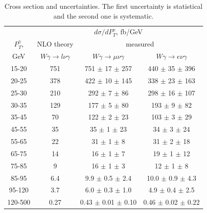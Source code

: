 \begin{table}[h]
  \scriptsize
  \begin{center}
  \caption{Cross section and uncertainties. The first uncertainty is statistical and the second one is systematic.}
  \begin{tabular}{|c|c|c|c|}
                     & \multicolumn{3}{|c|}{$d\sigma/dP_{T}^{\gamma}$, fb/GeV} \\ 
     $P_T^{\gamma}$, & NLO theory                          &  \multicolumn{2}{|c|}{measured}      \\
    GeV              &  $W\gamma\rightarrow l\nu\gamma$ & $W\gamma\rightarrow \mu\nu\gamma$  & $W\gamma\rightarrow e\nu\gamma$    \\ \hline
    15-20 & 751 & 751 $\pm$ 17 $\pm$ 257 & 440 $\pm$ 35 $\pm$ 396\\ \hline
    20-25 & 378 & 422 $\pm$ 10 $\pm$ 145 & 338 $\pm$ 23 $\pm$ 163\\ \hline
    25-30 & 210 & 292 $\pm$ 7 $\pm$ 86 & 298 $\pm$ 16 $\pm$ 107\\ \hline
    30-35 & 129 & 177 $\pm$ 5 $\pm$ 80  & 193 $\pm$ 9 $\pm$ 82\\ \hline
    35-45 & 70 & 122 $\pm$ 2 $\pm$ 23 & 103 $\pm$ 3 $\pm$ 29\\ \hline
    45-55 & 35 & 35 $\pm$ 1 $\pm$ 23 & 34 $\pm$ 3 $\pm$ 24\\ \hline
    55-65 & 22 & 31 $\pm$ 1 $\pm$ 8  & 31 $\pm$ 2 $\pm$ 18\\ \hline
    65-75 & 14 & 16 $\pm$ 1 $\pm$ 7 & 19 $\pm$ 1 $\pm$ 12 \\ \hline
    75-85 & 9 & 16 $\pm$ 1 $\pm$ 3 & 12 $\pm$ 1 $\pm$ 8\\ \hline
    85-95 & 6.4 & 9.9 $\pm$ 0.5 $\pm$ 2.4 & 10.0 $\pm$ 0.9 $\pm$ 4.3\\ \hline
    95-120 & 3.7 & 6.0 $\pm$ 0.3 $\pm$ 1.0 & 4.9 $\pm$ 0.4 $\pm$ 2.5\\ \hline
    120-500 & 0.27 & 0.43 $\pm$ 0.01 $\pm$ 0.10 & 0.46 $\pm$ 0.02 $\pm$ 0.22\\ \hline
  \end{tabular}
  \label{tab:cs_mc_vs_meas_WGamma}
  \end{center}
\end{table}
 
